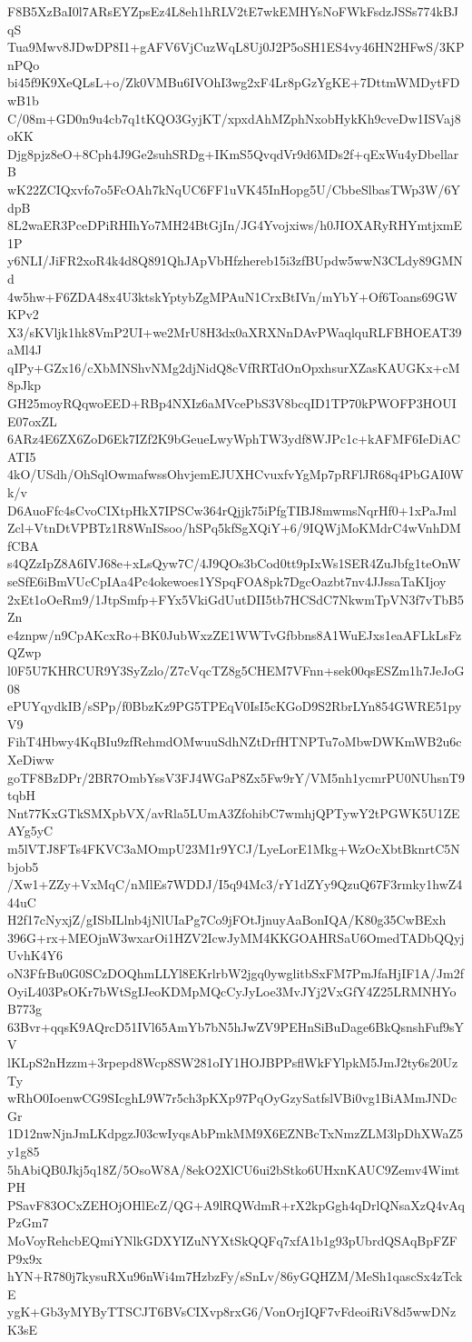 F8B5XzBaI0l7ARsEYZpsEz4L8eh1hRLV2tE7wkEMHYsNoFWkFsdzJSSs774kBJqS
Tua9Mwv8JDwDP8I1+gAFV6VjCuzWqL8Uj0J2P5oSH1ES4vy46HN2HFwS/3KPnPQo
bi45f9K9XeQLsL+o/Zk0VMBu6IVOhI3wg2xF4Lr8pGzYgKE+7DttmWMDytFDwB1b
C/08m+GD0n9u4cb7q1tKQO3GyjKT/xpxdAhMZphNxobHykKh9cveDw1ISVaj8oKK
Djg8pjz8eO+8Cph4J9Ge2suhSRDg+IKmS5QvqdVr9d6MDs2f+qExWu4yDbellarB
wK22ZCIQxvfo7o5FcOAh7kNqUC6FF1uVK45InHopg5U/CbbeSlbasTWp3W/6YdpB
8L2waER3PceDPiRHIhYo7MH24BtGjIn/JG4Yvojxiws/h0JIOXARyRHYmtjxmE1P
y6NLI/JiFR2xoR4k4d8Q891QhJApVbHfzhereb15i3zfBUpdw5wwN3CLdy89GMNd
4w5hw+F6ZDA48x4U3ktskYptybZgMPAuN1CrxBtIVn/mYbY+Of6Toans69GWKPv2
X3/sKVljk1hk8VmP2UI+we2MrU8H3dx0aXRXNnDAvPWaqlquRLFBHOEAT39aMl4J
qIPy+GZx16/cXbMNShvNMg2djNidQ8cVfRRTdOnOpxhsurXZasKAUGKx+cM8pJkp
GH25moyRQqwoEED+RBp4NXIz6aMVcePbS3V8bcqID1TP70kPWOFP3HOUIE07oxZL
6ARz4E6ZX6ZoD6Ek7IZf2K9bGeueLwyWphTW3ydf8WJPc1c+kAFMF6IeDiACATI5
4kO/USdh/OhSqlOwmafwssOhvjemEJUXHCvuxfvYgMp7pRFlJR68q4PbGAI0Wk/v
D6AuoFfc4sCvoCIXtpHkX7IPSCw364rQjjk75iPfgTIBJ8mwmsNqrHf0+1xPaJml
Zcl+VtnDtVPBTz1R8WnISsoo/hSPq5kfSgXQiY+6/9IQWjMoKMdrC4wVnhDMfCBA
s4QZzIpZ8A6IVJ68e+xLsQyw7C/4J9QOs3bCod0tt9pIxWs1SER4ZuJbfg1teOnW
seSfE6iBmVUcCpIAa4Pc4okewoes1YSpqFOA8pk7DgcOazbt7nv4JJssaTaKIjoy
2xEt1oOeRm9/1JtpSmfp+FYx5VkiGdUutDII5tb7HCSdC7NkwmTpVN3f7vTbB5Zn
e4znpw/n9CpAKcxRo+BK0JubWxzZE1WWTvGfbbns8A1WuEJxs1eaAFLkLsFzQZwp
l0F5U7KHRCUR9Y3SyZzlo/Z7cVqcTZ8g5CHEM7VFnn+sek00qsESZm1h7JeJoG08
ePUYqydkIB/sSPp/f0BbzKz9PG5TPEqV0IsI5cKGoD9S2RbrLYn854GWRE51pyV9
FihT4Hbwy4KqBIu9zfRehmdOMwuuSdhNZtDrfHTNPTu7oMbwDWKmWB2u6cXeDiww
goTF8BzDPr/2BR7OmbYssV3FJ4WGaP8Zx5Fw9rY/VM5nh1ycmrPU0NUhsnT9tqbH
Nnt77KxGTkSMXpbVX/avRla5LUmA3ZfohibC7wmhjQPTywY2tPGWK5U1ZEAYg5yC
m5lVTJ8FTs4FKVC3aMOmpU23M1r9YCJ/LyeLorE1Mkg+WzOcXbtBknrtC5Nbjob5
/Xw1+ZZy+VxMqC/nMlEs7WDDJ/I5q94Mc3/rY1dZYy9QzuQ67F3rmky1hwZ444uC
H2f17cNyxjZ/gISbILlnb4jNlUIaPg7Co9jFOtJjnuyAaBonIQA/K80g35CwBExh
396G+rx+MEOjnW3wxarOi1HZV2IcwJyMM4KKGOAHRSaU6OmedTADbQQyjUvhK4Y6
oN3FfrBu0G0SCzDOQhmLLYl8EKrlrbW2jgq0ywglitbSxFM7PmJfaHjIF1A/Jm2f
OyiL403PsOKr7bWtSgIJeoKDMpMQcCyJyLoe3MvJYj2VxGfY4Z25LRMNHYoB773g
63Bvr+qqsK9AQrcD51IVl65AmYb7bN5hJwZV9PEHnSiBuDage6BkQsnshFuf9sYV
lKLpS2nHzzm+3rpepd8Wcp8SW281oIY1HOJBPPsflWkFYlpkM5JmJ2ty6s20UzTy
wRhO0IoenwCG9SIcghL9W7r5ch3pKXp97PqOyGzySatfslVBi0vg1BiAMmJNDcGr
1D12nwNjnJmLKdpgzJ03cwIyqsAbPmkMM9X6EZNBcTxNmzZLM3lpDhXWaZ5y1g85
5hAbiQB0Jkj5q18Z/5OsoW8A/8ekO2XlCU6ui2bStko6UHxnKAUC9Zemv4WimtPH
PSavF83OCxZEHOjOHlEcZ/QG+A9lRQWdmR+rX2kpGgh4qDrlQNsaXzQ4vAqPzGm7
MoVoyRehcbEQmiYNlkGDXYIZuNYXtSkQQFq7xfA1b1g93pUbrdQSAqBpFZFP9x9x
hYN+R780j7kysuRXu96nWi4m7HzbzFy/sSnLv/86yGQHZM/MeSh1qascSx4zTckE
ygK+Gb3yMYByTTSCJT6BVsCIXvp8rxG6/VonOrjIQF7vFdeoiRiV8d5wwDNzK3sE
